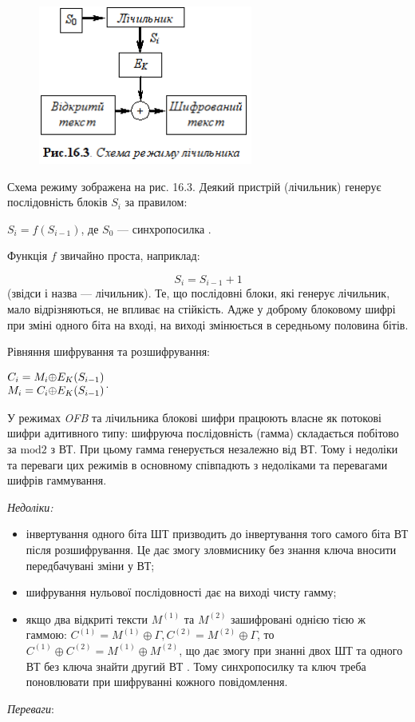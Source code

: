 \begin{figure}
\centering
\includegraphics[width=2.7709in,height=2.052in]{crypt-img/crypt-img339.png}
\end{figure}
Схема режиму зображена на рис. 16.3. Деякий пристрій (лічильник) генерує
послідовність блоків  ${S_{{i}}}$ за правилом: 

{\centering
 ${S_{{i}}=f(S_{{i-1}})}$, де  ${S_{{0}}}$ --- синхропосилка .
\par}

Функція  ${f}$ звичайно проста, наприклад:

\begin{equation*}
{S_{{i}}=S_{{i-1}}+1}
\end{equation*}
(звідси і назва --- лічильник). Те, що послідовні блоки, які генерує лічильник,
мало відрізняються, не впливає на стійкість. Адже у доброму блоковому шифрі при
зміні одного біта на вході, на виході змінюється в середньому половина бітів.

Рівняння шифрування та розшифрування:

{\centering
 $\begin{matrix}{C_{{i}}=M_{{i}}{\oplus}E_{{K}}(S_{{i-1}})}\hfill\null
\\M_{{i}}=C_{{i}}{\oplus}E_{{K}}(S_{{i-1}})\hfill\null \end{matrix}\hfill $.
\par}

У режимах \textit{OFB}\textit{ }та лічильника блокові шифри працюють власне як
потокові шифри адитивного типу: шифруюча послідовність (гамма) складається
побітово за  ${\text{mod}2}$ з ВТ. При цьому гамма генерується незалежно від
ВТ. Тому і недоліки та переваги цих режимів в основному співпадють з недоліками
та перевагами шифрів гаммування.

{\itshape
Недоліки:}

\liststyleWWviiiNumxliv
\begin{itemize}
\item інвертування одного біта ШТ призводить до інвертування того самого біта ВТ
після розшифрування. Це дає змогу зловмиснику без знання ключа вносити
передбачувані зміни у ВТ;
\item шифрування нульової послідовності дає на виході чисту гамму;
\item якщо два відкриті тексти  ${M^{{(1)}}}$ та  ${M^{{(2)}}}$ зашифровані
однією тією ж гаммою:  ${C^{{(1)}}=M^{{(1)}}{\oplus}\Gamma
,C^{{(2)}}=M^{{(2)}}{\oplus}\Gamma }$, то 
${C^{{(1)}}{\oplus}C^{{(2)}}=M^{{(1)}}{\oplus}M^{{(2)}}}$, що дає змогу при
знанні двох ШТ та одного ВТ без ключа знайти другий ВТ . Тому синхропосилку та
ключ треба поновлювати при шифруванні кожного повідомлення.
\end{itemize}
\textit{Переваги}:

